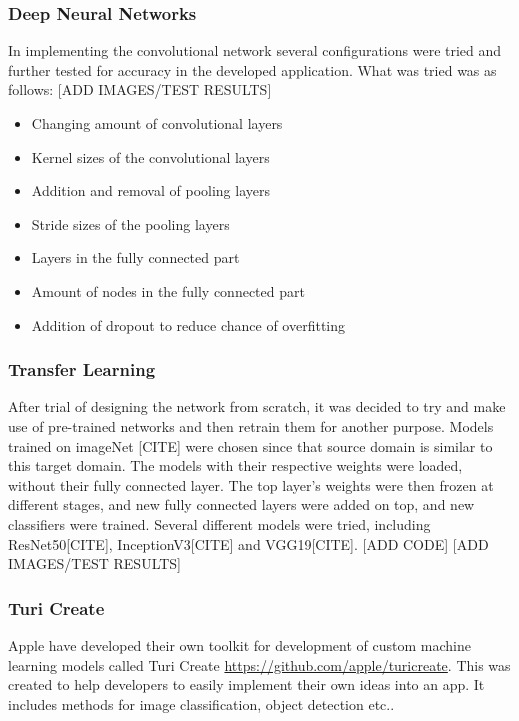 \subsubsection{Deep Neural Networks}
In implementing the convolutional network several configurations were tried and further tested for accuracy in the developed application. What was tried was as follows:
[ADD IMAGES/TEST RESULTS]

\begin{itemize}
\item Changing amount of convolutional layers
\item Kernel sizes of the convolutional layers
\item Addition and removal of pooling layers
\item Stride sizes of the pooling layers
\item Layers in the fully connected part
\item Amount of nodes in the fully connected part
\item Addition of dropout to reduce chance of overfitting 
\end{itemize}

\subsubsection{Transfer Learning}
After trial of designing the network from scratch, it was decided to try and make use of pre-trained networks and then retrain them for another purpose. Models trained on imageNet [CITE] were chosen since that source domain is similar to this target domain. The models with their respective weights were loaded, without their fully connected layer. The top layer's weights were then frozen at different stages, and new fully connected layers were added on top, and new classifiers were trained. 
Several different models were tried, including ResNet50[CITE], InceptionV3[CITE] and VGG19[CITE].
[ADD CODE]
[ADD IMAGES/TEST RESULTS]

\subsubsection{Turi Create}
Apple have developed their own toolkit for development of custom machine learning models called Turi Create \url{https://github.com/apple/turicreate}. This was created to help developers to easily implement their own ideas into an app. It includes methods for image classification, object detection etc.. 

